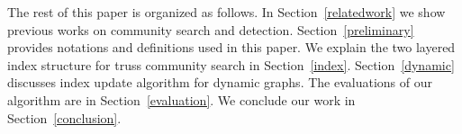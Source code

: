 
The rest of this paper is organized as follows. In Section~\ref{relatedwork} we show previous works on community search and detection. Section~\ref{preliminary} provides notations and definitions used in this paper. We explain the two layered index structure for truss community search in Section~\ref{index}. Section~\ref{dynamic} discusses index update algorithm for dynamic graphs. The evaluations of our algorithm are in Section~\ref{evaluation}. We conclude our work in Section~\ref{conclusion}.


~\cite{durmaz2017frequent,zong2015behavior,yin2017taming}


